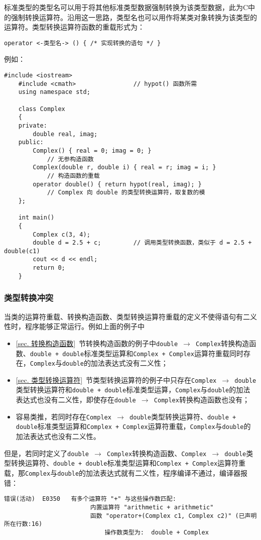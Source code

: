 \documentclass[10pt, a4paper, oneside, fontset=none]{ctexart}
\theoremstyle{plain}
\theoremstyle{definition}
\newcommand{\colors}[1]{\color{#1!75!black}}
\begin{document}
标准类型的类型名可以用于将其他标准类型数据强制转换为该类型数据，此为C中的强制转换运算符。沿用这一思路，类型名也可以用作将某类对象转换为该类型的运算符。类型转换运算符函数的重载形式为：
\label{sec. 类型转换运算符} 
\begin{lstlisting}[style=intro]
	operator <-类型名-> () { /* 实现转换的语句 */ }
\end{lstlisting}
例如：
\begin{lstlisting}[moreemph={Complex, ostream}, emphstyle=\colors{qinglv}, moreemph={[2]{output, real, imag, c, r, i, c1, c2, c3, c4, c5}}, emphstyle={[2]\it\ttfamily},]
	#include <iostream>
	#include <cmath>				// hypot() 函数所需
	using namespace std;
	
	class Complex
	{
	private:
		double real, imag;
	public:
		Complex() { real = 0; imag = 0; }
			// 无参构造函数
		Complex(double r, double i) { real = r; imag = i; }
			// 构造函数的重载
		operator double() { return hypot(real, imag); }
			// Complex 向 double 的类型转换运算符，取复数的模
	};
	
	int main()
	{
		Complex c(3, 4);
		double d = 2.5 + c;			// 调用类型转换函数，类似于 d = 2.5 + double(c1)
		cout << d << endl;
		return 0;
	}
\end{lstlisting}

\subsubsection{类型转换冲突}

当类的运算符重载、转换构造函数、类型转换运算符重载的定义不使得语句有二义性时，程序能够正常运行。例如上面的例子中
\begin{itemize}
	\item \ref{sec. 转换构造函数}~节转换构造函数的例子中\texttt{double $\to$ Complex}转换构造函数、\texttt{double + double}标准类型运算和\texttt{Complex + Complex}运算符重载同时存在，\texttt{Complex}与\texttt{double}的加法表达式没有二义性；
	\item \ref{sec. 类型转换运算符}~节类型转换运算符的例子中只存在\texttt{Complex $\to$ double}类型转换运算符和\texttt{double + double}标准类型运算，\texttt{Complex}与\texttt{double}的加法表达式也没有二义性，即使存在\texttt{double $\to$ Complex}转换构造函数也没有；
	\item 容易类推，若同时存在\texttt{Complex $\to$ double}类型转换运算符、\texttt{double + double}标准类型运算和\texttt{Complex + Complex}运算符重载，\texttt{Complex}与\texttt{double}的加法表达式也没有二义性。
\end{itemize}
但是，若同时定义了\texttt{double $\to$ Complex}转换构造函数、\texttt{Complex $\to$ double}类型转换运算符、\texttt{double + double}标准类型运算和\texttt{Complex + Complex}运算符重载，那\texttt{Complex}与\texttt{double}的加法表达式就有二义性，程序编译不通过，编译器报错：
\begin{lstlisting}[language={}, numbers=none]
	错误(活动)	E0350	有多个运算符 "+" 与这些操作数匹配:
						内置运算符 "arithmetic + arithmetic"
       	    			函数 "operator+(Complex c1, Complex c2)" (已声明 所在行数:16)
        					操作数类型为:  double + Complex
\end{lstlisting}
\end{document}
